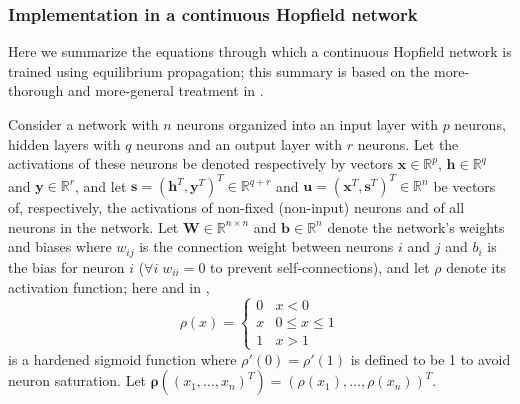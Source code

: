 \documentclass[utf8]{frontiersSCNS}
\newcommand{\mtx}[1]{\bm{#1}}
\begin{document}
\subsubsection{Implementation in a continuous Hopfield network}

Here we summarize the equations through which a continuous Hopfield network is trained using equilibrium propagation; this summary is based on the more-thorough and more-general treatment in \citep{scellier17}.

Consider a network with $n$ neurons organized into an input layer with $p$ neurons, hidden layers with $q$ neurons and an output layer with $r$ neurons. Let the activations of these neurons be denoted respectively by vectors $\mtx{x}\in\mathbb{R}^{p}$, $\mtx{h}\in\mathbb{R}^{q}$ and $\mtx{y}\in\mathbb{R}^{r}$, and let $\mtx{s}=(\mtx{h}^{T},\mtx{y}^{T})^{T}\in\mathbb{R}^{q+r}$ and $\mtx{u}=(\mtx{x}^{T}, \mtx{s}^{T})^{T}\in\mathbb{R}^{n}$ be vectors of, respectively, the activations of non-fixed (non-input) neurons and of all neurons in the network. Let $\mtx{W}\in\mathbb{R}^{n\times n}$ and $\mtx{b}\in\mathbb{R}^{n}$ denote the network's weights and biases where $w_{ij}$ is the connection weight between neurons $i$ and $j$ and $b_i$ is the bias for neuron $i$ ($\forall i \;w_{ii}=0$ to prevent self-connections), and let $\rho$ denote its activation function; here and in \citep{scellier17},
\begin{equation}
\rho(x)=\begin{cases}0&x<0\\x&0\leq x\leq 1\\1&x>1\end{cases} \label{eqn:hardened_sigmoid}
\end{equation}
 is a hardened sigmoid function
where $\rho'(0)=\rho'(1)$ is defined to be 1 to avoid neuron saturation. Let $\mtx{\rho}((x_1,\hdots, x_n)^T)=(\rho(x_1),\hdots,\rho(x_n))^T$.
\end{document}
